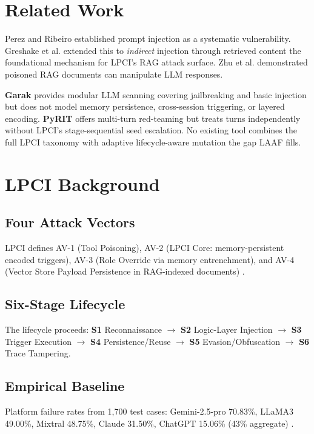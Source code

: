 \documentclass[10pt,twocolumn]{article}
\begin{document}
\section{Related Work}
\label{sec:related}

Perez and Ribeiro \cite{perez2022} established prompt injection as a
systematic vulnerability.  Greshake et al. \cite{greshake2023} extended this
to \textit{indirect} injection through retrieved content  the foundational
mechanism for LPCI's RAG attack surface.  Zhu et al. \cite{zhu2023}
demonstrated poisoned RAG documents can manipulate LLM responses.

\textbf{Garak} \cite{garak} provides modular LLM scanning covering
jailbreaking and basic injection but does not model memory persistence,
cross-session triggering, or layered encoding.  \textbf{PyRIT} \cite{pyrit}
offers multi-turn red-teaming but treats turns independently without
LPCI's stage-sequential seed escalation.  No existing tool combines the
full LPCI taxonomy with adaptive lifecycle-aware mutation  the gap LAAF
fills.

\section{LPCI Background}
\label{sec:lpci}

\subsection{Four Attack Vectors}
LPCI defines AV-1 (Tool Poisoning), AV-2 (LPCI Core: memory-persistent
encoded triggers), AV-3 (Role Override via memory entrenchment), and AV-4
(Vector Store Payload Persistence in RAG-indexed documents)
\cite{atta2025lpci}.

\subsection{Six-Stage Lifecycle}
The lifecycle proceeds: \textbf{S1} Reconnaissance $\to$ \textbf{S2}
Logic-Layer Injection $\to$ \textbf{S3} Trigger Execution $\to$
\textbf{S4} Persistence/Reuse $\to$ \textbf{S5} Evasion/Obfuscation
$\to$ \textbf{S6} Trace Tampering.

\subsection{Empirical Baseline}
Platform failure rates from 1,700 test cases: Gemini-2.5-pro 70.83\%,
LLaMA3 49.00\%, Mixtral 48.75\%, Claude 31.50\%, ChatGPT 15.06\%
(43\% aggregate) \cite{atta2025lpci}.
\end{document}

